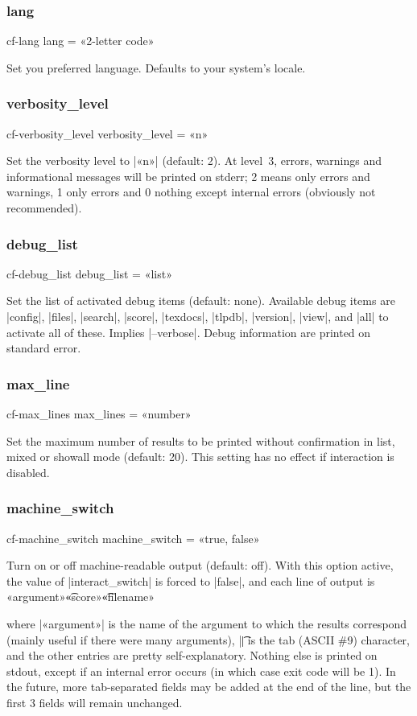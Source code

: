 \documentclass[a4paper,oneside]{scrartcl}
\makeatletter
\newif\ifframed
\newenvironment{cmdsubsub}[2]
  {\framedfalse \commandes\subsubsection{#1}{#2}}
  {\endcommandes}
\newenvironment{htcode}
  {\SaveVerbatim[samepage, gobble=2]{verbmat}}
  {
    \endSaveVerbatim
    \par\medskip\noindent\hspace*{\parindent}%
    \BUseVerbatim{verbmat}%
    \par\medskip\@endpetrue
  }
\makeatother
\begin{document}
\begin{cmdsubsub}{lang}{cf-lang}
  lang = «2-letter code»
\end{cmdsubsub}

Set you preferred language. Defaults to your system's locale.

\begin{cmdsubsub}{verbosity_level}{cf-verbosity_level}
  verbosity_level = «n»
\end{cmdsubsub}

Set the verbosity level to |«n»| (default: 2). At level~3, errors, warnings and
informational messages will be printed on stderr; 2 means only errors and
warnings, 1 only errors and 0 nothing except internal errors (obviously not
recommended).

\begin{cmdsubsub}{debug_list}{cf-debug_list}
  debug_list = «list»
\end{cmdsubsub}

Set the list of activated debug items (default: none). Available debug items
are |config|, |files|, |search|, |score|, |texdocs|, |tlpdb|, |version|,
|view|, and |all| to activate all of these. Implies |--verbose|. Debug
information are printed on standard error.

\begin{cmdsubsub}{max_line}{cf-max_lines}
  max_lines = «number»
\end{cmdsubsub}

Set the maximum number of results to be printed without confirmation in list,
mixed or showall mode (default: 20). This setting has no effect if interaction
is disabled.

\begin{cmdsubsub}{machine_switch}{cf-machine_switch}
  machine_switch = «true, false»
\end{cmdsubsub}

Turn on or off machine-readable output (default: off). With this option
active, the value of |interact_switch| is forced to |false|, and each line of
output is
\begin{htcode}
  «argument»\t«score»\t«filename»
\end{htcode}
where |«argument»| is the name of the argument to which the results correspond
(mainly useful if there were many arguments), |\t| is the tab (ASCII \#9)
character, and the other entries are pretty self-explanatory. Nothing else is
printed on stdout, except if an internal error occurs (in which case exit code
will be 1). In the future, more tab-separated fields may be added at the end
of the line, but the first 3 fields will remain unchanged.
\end{document}
